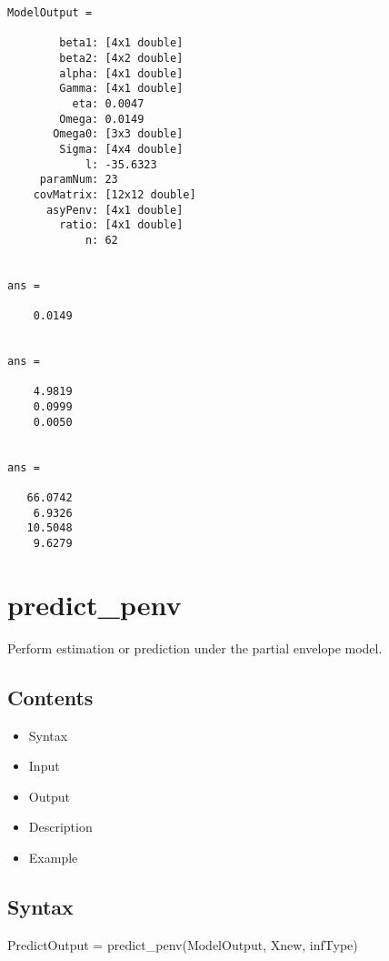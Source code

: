 \documentclass[a4paper,11pt,openany]{memoir}
\begin{document}
        \color{lightgray}\ttfamily \begin{verbatim}
ModelOutput = 

        beta1: [4x1 double]
        beta2: [4x2 double]
        alpha: [4x1 double]
        Gamma: [4x1 double]
          eta: 0.0047
        Omega: 0.0149
       Omega0: [3x3 double]
        Sigma: [4x4 double]
            l: -35.6323
     paramNum: 23
    covMatrix: [12x12 double]
      asyPenv: [4x1 double]
        ratio: [4x1 double]
            n: 62


ans =

    0.0149


ans =

    4.9819
    0.0999
    0.0050


ans =

   66.0742
    6.9326
   10.5048
    9.6279

\end{verbatim} \rmfamily
\color{black}

\newpage

\rmfamily
\color{black}\section{predict\_penv}

\begin{par}
Perform estimation or prediction under the partial envelope model.
\end{par} \vspace{1em}

\subsection*{Contents}

\begin{itemize}
\setlength{\itemsep}{-1ex}
   \item Syntax
   \item Input
   \item Output
   \item Description
   \item Example
\end{itemize}


\subsection*{Syntax}

\begin{par}
PredictOutput = predict\_penv(ModelOutput, Xnew, infType)
\end{par} \vspace{1em}
\end{document}
